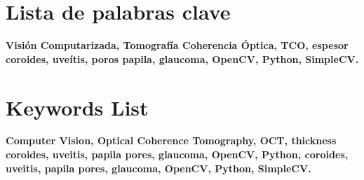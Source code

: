 \chapter{Lista de palabras clave}
\textbf{Visión Computarizada, Tomografía Coherencia Óptica, TCO,
  espesor coroides, uveítis, poros papila, glaucoma, OpenCV,
  \mbox{Python}, SimpleCV.}
\chapter{Keywords List}
\textbf{Computer Vision, Optical Coherence Tomography, OCT, thickness
  coroides, uveitis, papila pores, glaucoma, OpenCV, Python,
  coroides, uveitis, papila pores, glaucoma, OpenCV, Python,
  SimpleCV.}
